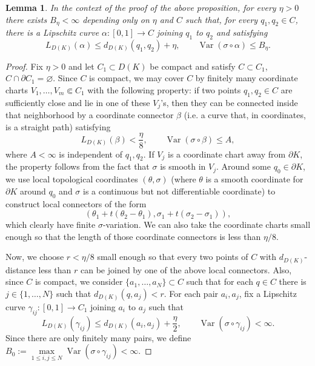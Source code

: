 \documentclass[11pt]{article}
\theoremstyle{definition}
\theoremstyle{remark}
\theoremstyle{plain}
\newtheorem{lemma}[definition]{Lemma}
\begin{document}
\begin{lemma}\label{lem:coord_connectors}
In the context of the proof of the above proposition, for every $\eta>0$ there exists
$B_\eta<\infty$ depending only on $\eta$ and $C$ such that, for every $q_1,q_2\in C$, there is a Lipschitz curve $\alpha:[0,1]\to C$ joining $q_1$ to $q_2$ and satisfying
$$L_{D(K)}(\alpha)\le d_{D(K)}(q_1,q_2)+\eta,\qquad
\operatorname{Var}(\sigma\circ\alpha)\le B_\eta.$$
\end{lemma}

\begin{proof}
Fix $\eta>0$ and let $C_1\subset D(K)$ be compact and satisfy $C\subset C_1$, $C\cap \partial C_1 = \varnothing$. Since $C$ is compact, we may cover $C$ by finitely many coordinate charts $V_1,\ldots,V_m\Subset C_1$ with the following
property: if two points $q_1,q_2\in C$ are sufficiently close and lie in one of these $V_j$'s, then they can be connected inside that
neighborhood by a coordinate connector $\beta$ (i.e. a curve that, in coordinates, is a straight path) satisfying
$$L_{D(K)}(\beta)<\frac{\eta}{8},
\qquad
\operatorname{Var}(\sigma\circ\beta)\le A,$$
where $A<\infty$ is independent of $q_1,q_2$.
If $V_j$ is a coordinate chart away from $\partial K$, the property follows from the fact that $\sigma$ is smooth in $V_j$. Around some $q_0\in \partial K$, we use local topological coordinates $(\theta,\sigma)$ (where $\theta$ is a smooth coordinate for $\partial K$ around $q_0$ and $\sigma$ is a continuous but not differentiable coordinate) to construct local connectors of the form
$$(\theta_1+ t(\theta_2-\theta_1),\sigma_1+t(\sigma_2-\sigma_1)),$$
which clearly have finite $\sigma$-variation. We can also take the coordinate charts small enough so that the length of those coordinate connectors is less than $\eta/8$.

Now, we choose $r<\eta/8$ small enough so that every two points of $C$ with $d_{D(K)}$-distance less than $r$ can be joined by one of the above local connectors. Also, since $C$ is compact, we consider $\{a_1,\ldots,a_N\}\subset C$ such that for each $q\in C$ there is $j\in \{1,\ldots,N\}$ such that $d_{D(K)}(q,a_j)<r$. For each pair $a_i,a_j$, fix a Lipschitz curve $\gamma_{ij}:[0,1]\to C_1$ joining $a_i$ to $a_j$ such that
$$L_{D(K)}(\gamma_{ij})
\le d_{D(K)}(a_i,a_j)+\frac{\eta}{2},
\qquad
\operatorname{Var}(\sigma\circ\gamma_{ij})<\infty.$$
Since there are only finitely many pairs, we define $B_0:=\max\limits_{1\le i,j\le N} \operatorname{Var}(\sigma\circ\gamma_{ij})<\infty$.


\end{proof}
\end{document}
